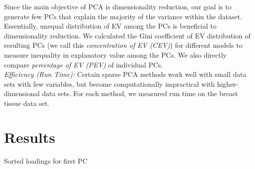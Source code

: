 \documentclass[11pt,letterpaper]{report}
\begin{document}
Since the main objective of PCA is dimensionality reduction, our goal is to generate few PCs that explain the majority of the variance within the dataset. Essentially, unequal distribution of EV among the PCs is beneficial to dimensionality reduction. We calculated the Gini coefficient of EV distribution of resulting PCs (we call this \textit{concentration of EV (CEV)}) for different models to measure inequality in explanatory value among the PCs. We also directly compare \textit{percentage of EV (PEV)} of individual PCs.\\ 

\textit{Efficiency (Run Time):} Certain sparse PCA methods work well with small data sets with few variables, but become computationally impractical with higher-dimensional data sets. For each method, we measured run time on the breast tissue data set.

\section*{Results}

%         
%         

\begin{table}[ht]
\centering
\caption{Sorted loadings for first PC}\label{tab:sorLoad}
\begin{tabular}%
    \centering
    
\end{tabular}
\vspace*{3mm}
\caption{Summary statistics}\label{tab:sumStats}
\begin{tabular}%
    \centering
    
\end{tabular}
\end{table}
\end{document}
